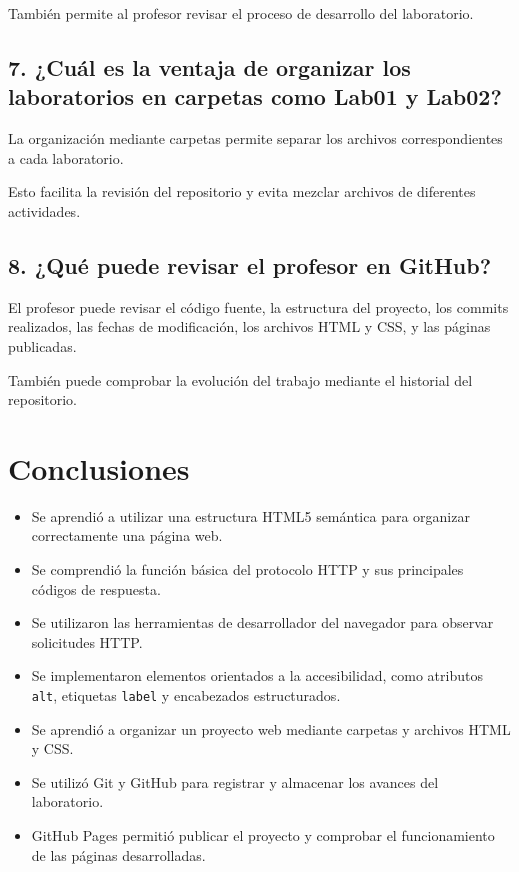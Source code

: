 \documentclass{article}
\begin{document}
También permite al profesor revisar el proceso de desarrollo
del laboratorio.

\subsection{7. ¿Cuál es la ventaja de organizar los laboratorios
en carpetas como Lab01 y Lab02?}

La organización mediante carpetas permite separar los archivos
correspondientes a cada laboratorio.

Esto facilita la revisión del repositorio y evita mezclar
archivos de diferentes actividades.

\subsection{8. ¿Qué puede revisar el profesor en GitHub?}

El profesor puede revisar el código fuente, la estructura del
proyecto, los commits realizados, las fechas de modificación,
los archivos HTML y CSS, y las páginas publicadas.

También puede comprobar la evolución del trabajo mediante
el historial del repositorio.


\section{Conclusiones}

\begin{itemize}

    \item Se aprendió a utilizar una estructura HTML5 semántica
    para organizar correctamente una página web.

    \item Se comprendió la función básica del protocolo HTTP
    y sus principales códigos de respuesta.

    \item Se utilizaron las herramientas de desarrollador
    del navegador para observar solicitudes HTTP.

    \item Se implementaron elementos orientados a la
    accesibilidad, como atributos \texttt{alt}, etiquetas
    \texttt{label} y encabezados estructurados.

    \item Se aprendió a organizar un proyecto web mediante
    carpetas y archivos HTML y CSS.

    \item Se utilizó Git y GitHub para registrar y almacenar
    los avances del laboratorio.

    \item GitHub Pages permitió publicar el proyecto y comprobar
    el funcionamiento de las páginas desarrolladas.

\end{itemize}
\end{document}
